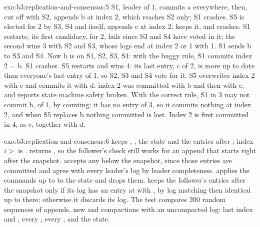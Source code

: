 \begin{solution}{exo:b3:replication-and-consensus:5}
S1, leader of  1, commits a everywhere, then, cut off with S2, appends b at index 2, which reaches S2 only; S1 crashes. S5 is elected for  2 by S3, S4 and itself, appends c at index 2, keeps it, and crashes. S1 restarts; its first candidacy, for  2, fails since S3 and S4 have voted in it; the second wins  3 with S2 and S3, whose logs end at index 2 or 1 with  1. S1 sends b to S3 and S4. Now b is on S1, S2, S3, S4: with the buggy rule, S1 commits index 2 = b. S1 crashes. S5 restarts and wins  4: its last entry, c of  2, is more up to date than everyone's last entry of  1, so S2, S3 and S4 vote for it. S5 overwrites index 2 with c and commits it with d: index 2 was committed with b and then with c, and  reports state machine safety broken. With the correct rule, S1 in  3 may not commit b, of  1, by counting; it has no entry of  3, so it commits nothing at index 2, and when S5 replaces b nothing committed is lost. Index 2 is first committed in  4, as c, together with d.
\end{solution}

\begin{solution}{exo:b3:replication-and-consensus:6}
 keeps , , the state and the entries after ; index $i > $  is .  returns , so the follower's check still works for an append that starts right after the snapshot.  accepts any  below the snapshot, since those entries are committed and agree with every leader's log by leader completeness.  applies the commands up to  to the state and drops them.  keeps the follower's entries after the snapshot only if its log has an entry at  with , by log matching then identical up to there; otherwise it discards its log. The test compares 200 random sequences of appends, new  and compactions with an uncompacted log: last index and , every , every , and the state.
\end{solution}

